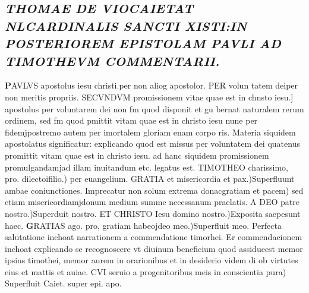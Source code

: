 \documentclass{article}
\begin{document}
\begin{pages}
{}
\subsection*{\textit{THOMAE DE VIOCAIETAT NLCARDINALIS SANCTI XISTI:IN POSTERIOREM EPISTOLAM PAVLI AD TIMOTHEVM COMMENTARII. }}\pstart \huge\textbf{P}\normalsize AVLVS apostolus iesu christi.per non aliog apostolor. PER volun tatem deiper non meritis propriis. SECVNDVM promissionem vitae quae est in chnsto iesu.] apostolus per voluntarem dei non fm quod disponit et gu bernat naturalem rerum ordinem, sed fm quod pmittit vitam quae est in christo iesu nune per fidemjpostremo autem per imortalem gloriam enam corpo ris. Materia siquidem apostolatus significatur: explicando quod est missus per voluntatem dei quatenus promittit vitam quae est in christo iesu. ad hanc siquidem promissionem promulgandamjad illam inuitandum etc. legatus est. TIMOTHEO charissimo, pro. dilectoifilio.) per euangelium. GRATIA et misericordia et pax.)Superfluunt ambae coniunctiones. Imprecatur non solum extrema donacgratiam et pacem) sed etiam misericordiamjdonum medium summe necessanum praelatis. A DEO patre nostro.)Superduit nostro. ET CHRISTO Iesu domino nostro.)Exposita saepesunt haec.  \pend\pstart \huge\textbf{G}\normalsize RATIAS ago. pro, gratiam habeojdeo meo.)Superfluit meo. Perfecta salutatione inchoat narrationem a commendatione timorhei. Er commendacionem inchoat explicando se recognoscere vt diuinum beneficium quod assidueest memor ipsius timothei, memor aurem in orarionibus et in desiderio videm di ob virtutes eius et mattis et auiae. CVI seruio a progenitoribus meis in conscientia pura) Superfluit Caiet. super epi. apo.  \pend
\endnumbering
\end{pages}
\end{document}
